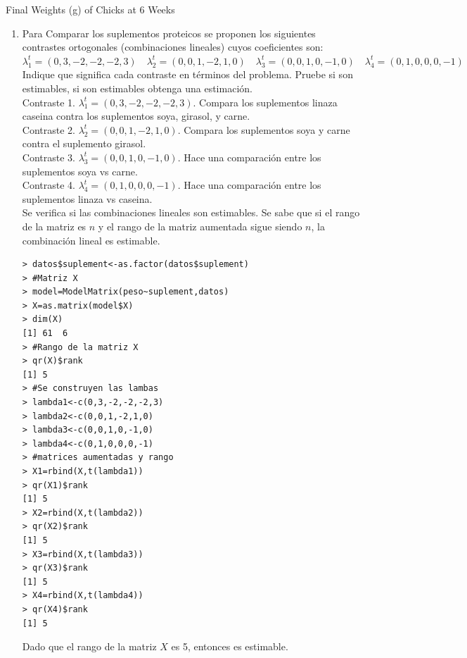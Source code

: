 \documentclass[10pt,a4paper]{report}
\begin{document}
\begin{enumerate}
Final Weights (g) of Chicks at 6 Weeks


\begin{enumerate}
\item Para Comparar los suplementos proteicos se proponen los siguientes contrastes ortogonales (combinaciones lineales) cuyos coeficientes son:\\

$\lambda_{1}^{t}=(0,3,-2,-2,-2,3)\quad \lambda_{2}^{t}=(0,0,1,-2,1,0) \quad \lambda_{3}^{t}=(0,0,1,0,-1,0)\quad \lambda_{4}^{t}=(0,1,0,0,0,-1)$\\
	
Indique que significa cada contraste en términos del problema. Pruebe si son estimables, si son estimables obtenga una estimación. \\
			
			
Contraste 1. $\lambda_{1}^{t}=(0,3,-2,-2,-2,3)$. Compara los suplementos linaza caseina contra los suplementos soya, girasol, y carne.\\

Contraste 2. $ \lambda_{2}^{t}=(0,0,1,-2,1,0)$. Compara los suplementos soya y carne contra el suplemento girasol.\\

Contraste 3. $\lambda_{3}^{t}=(0,0,1,0,-1,0)$. Hace una comparación entre los suplementos soya vs carne.\\

Contraste 4. $\lambda_{4}^{t}=(0,1,0,0,0,-1)$. Hace una comparación entre los suplementos linaza vs caseina. \\

Se verifica si las combinaciones lineales son estimables.
Se sabe que si el rango de la matriz es $n$ y el rango de la matriz aumentada sigue siendo $n$, la combinación lineal es estimable.\\

\begin{verbatim}
> datos$suplement<-as.factor(datos$suplement)
> #Matriz X
> model=ModelMatrix(peso~suplement,datos)
> X=as.matrix(model$X)
> dim(X) 
[1] 61  6
> #Rango de la matriz X
> qr(X)$rank
[1] 5
> #Se construyen las lambas
> lambda1<-c(0,3,-2,-2,-2,3)
> lambda2<-c(0,0,1,-2,1,0)
> lambda3<-c(0,0,1,0,-1,0)
> lambda4<-c(0,1,0,0,0,-1)
> #matrices aumentadas y rango
> X1=rbind(X,t(lambda1))
> qr(X1)$rank
[1] 5
> X2=rbind(X,t(lambda2))
> qr(X2)$rank
[1] 5
> X3=rbind(X,t(lambda3))
> qr(X3)$rank
[1] 5
> X4=rbind(X,t(lambda4))
> qr(X4)$rank
[1] 5
\end{verbatim}
Dado que el rango de la matriz $X$ es 5, entonces es estimable.\\


\end{enumerate}
\end{enumerate}
\end{document}
